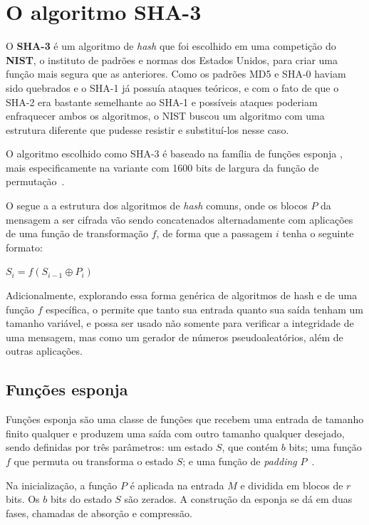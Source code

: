 \section{O algoritmo SHA-3}

O \textbf{SHA-3} é um algoritmo de \textit{hash} que foi escolhido em uma
competição do \textbf{NIST}, o instituto de padrões e normas dos Estados
Unidos, para criar uma função mais segura que as anteriores. Como os padrões
MD5 e SHA-0 haviam sido quebrados e o SHA-1 já possuía ataques teóricos, e com
o fato de que o SHA-2 era bastante semelhante ao SHA-1 e possíveis ataques
poderiam enfraquecer ambos os algoritmos, o NIST buscou um algoritmo com uma
estrutura diferente que pudesse resistir e substituí-los nesse caso.

O algoritmo escolhido como SHA-3 é baseado na família de funções esponja
\textbf{\Keccak}, mais especificamente na variante com 1600 bits de largura da
função de permutação~\cite{fips:2015}.

O \Keccak segue a a estrutura dos algoritmos de \textit{hash} comuns, onde os
blocos $P$ da mensagem a ser cifrada vão sendo concatenados alternadamente com
aplicações de uma função de transformação $f$, de forma que a passagem $i$
tenha o seguinte formato:

\begin{center}
        $S_{i} = f(S_{i-1} \oplus P_{i})$
\end{center}

Adicionalmente, explorando essa forma genérica de algoritmos de hash e de uma
função $f$ específica, o \Keccak permite que tanto sua entrada quanto sua saída
tenham um tamanho variável, e possa ser usado não somente para verificar a
integridade de uma mensagem, mas como um gerador de números pseudoaleatórios,
além de outras aplicações.

\subsection{Funções esponja}

Funções esponja são uma classe de funções que recebem uma entrada de tamanho
finito qualquer e produzem uma saída com outro tamanho qualquer desejado, sendo
definidas por três parâmetros: um estado $S$, que contém $b$ bits; uma função
$f$ que permuta ou transforma o estado $S$; e uma função de \textit{padding}
$P$~\cite{noekeon:2011}.

Na inicialização, a função $P$ é aplicada na entrada $M$ e dividida em blocos
de $r$ bits. Os $b$ bits do estado $S$ são zerados. A construção da esponja se
dá em duas fases, chamadas de absorção e compressão.

